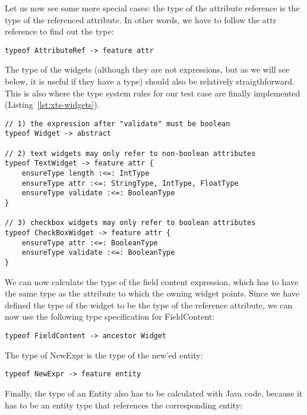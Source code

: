 Let us now see some more special cases: the type of the attribute reference
is the type of the referenced attribute. In other words, we have to follow the 
attr reference to find out the type:

\begin{lstlisting}[language=xts]
typeof AttributeRef -> feature attr
\end{lstlisting}

The type of the widgets (although they are not expressions, but as we will see
below, it is useful if they have a type) should also be relatively
straigthforward.
This is also where  the type system rules for our  test case are  finally
implemented (Listing~\ref{lst:xts-widgets}).

\begin{lstlisting}[language=xts,float,label=lst:xts-widgets,caption=Rules
for widgets.] 
// 1) the expression after "validate" must be boolean
typeof Widget -> abstract

// 2) text widgets may only refer to non-boolean attributes 
typeof TextWidget -> feature attr {
    ensureType length :<=: IntType
    ensureType attr :<=: StringType, IntType, FloatType
    ensureType validate :<=: BooleanType
}  

// 3) checkbox widgets may only refer to boolean attributes
typeof CheckBoxWidget -> feature attr {
    ensureType attr :<=: BooleanType
    ensureType validate :<=: BooleanType
}
\end{lstlisting}


We can now calculate the type of the field content expression, which has to have
the same type as  the attribute to which the owning widget points. Since we
have defined the type of the widget to be the type of the reference attribute,
we can now use the following type specification for FieldContent:

\begin{lstlisting}[language=xts]
typeof FieldContent -> ancestor Widget
\end{lstlisting}

The type of NewExpr is the type of the new'ed entity:

\begin{lstlisting}[language=xts]
    typeof NewExpr -> feature entity
\end{lstlisting}

Finally, the type of an Entity also has to be calculated with Java code, because
it has to be an entity type that references the corresponding entity:

